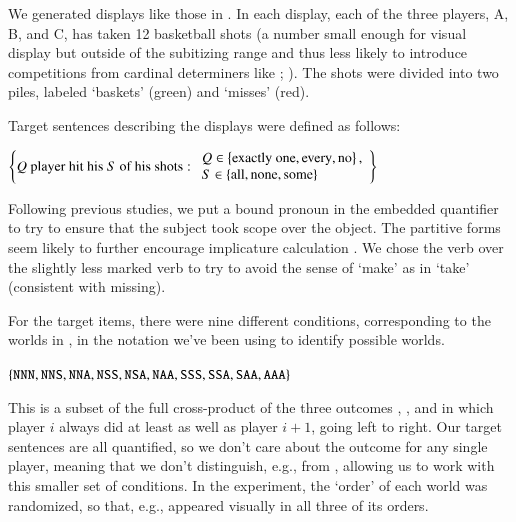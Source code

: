 \documentclass[leqno,12pt]{article}
\begin{document}
We generated displays like those in . In each
display, each of the three players, A, B, and C, has taken 12 basketball shots (a number
small enough for visual display but outside of the subitizing range
and thus less likely to introduce competitions from cardinal
determiners like ;
\citealt{Degen:Tanenhaus:2014}). The shots were divided into two
piles, labeled `baskets' (green) and `misses' (red). 


Target sentences describing the displays were defined as follows:
%
\begin{examples}
\item\label{expmsgs} 
    $\left\{ 
      \text{$Q$ player hit his $S$ of his shots} :
      \begin{array}{l}        
        Q \in \left\{ \text{exactly one}, \text{every}, \text{no} \right\}, \\
        S \in \left\{ \text{all}, \text{none}, \text{some} \right\}
      \end{array} \right\}$
\end{examples}
%
Following previous studies, we put a bound pronoun in the embedded
quantifier to try to ensure that the subject took scope over the
object. The partitive forms seem likely to further encourage
implicature calculation \citep{Grodner-etal:2010}. We chose the verb
 over the slightly less marked verb  to try to
avoid the sense of `make' as in `take' (consistent with missing).

For the target items, there were nine different conditions,
corresponding to the worlds in , in the notation we've been
using to identify possible worlds.
%
\begin{examples}
\item\label{conds} $\left\{ \texttt{NNN}, \texttt{NNS}, \texttt{NNA},
    \texttt{NSS}, \texttt{NSA}, \texttt{NAA}, \texttt{SSS}, \texttt{SSA},
    \texttt{SAA}, \texttt{AAA} \right\}$
\end{examples}


This is a subset of the full cross-product of the three outcomes
, , and  in which player $i$ always did at
least as well as player $i+1$, going left to right.  Our target
sentences are all quantified, so we don't care about the outcome for
any single player, meaning that we don't distinguish, e.g.,
 from , allowing us to work with this smaller
set of conditions. In the experiment, the `order' of each world was
randomized, so that, e.g.,  appeared visually in all three
of its orders.  
\end{document}
